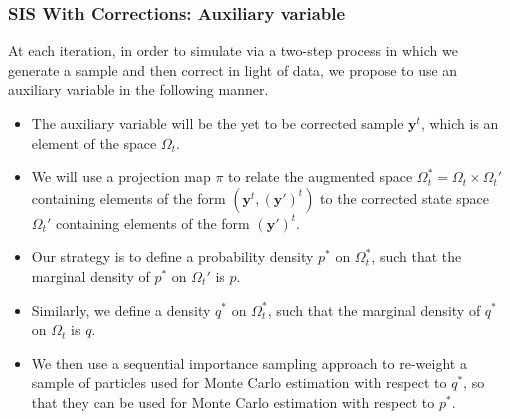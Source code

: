 \documentclass[9pt, xcolor={dvipsnames,svgnames,table}]{beamer}
\begin{document}
\begin{frame}
    \frametitle{SIS With Corrections: Auxiliary variable}
    At each iteration, in order to simulate via a two-step process in which we generate a sample and then correct in light of data, we propose to use an auxiliary variable in the following manner.
    \begin{itemize}
        \item The auxiliary variable will be the yet to be corrected sample $\bm{y}^{t}$, which is an element of the space $\Omega_t$.
        \item We will use a projection map $\pi$ to relate the augmented space $\Omega^*_t = \Omega_t \times \Omega_t'$ containing elements of the form $(\bm{y}^{t}, \bm{(y')}^{t})$ to the corrected state space $\Omega_t'$ containing elements of the form $\bm{(y')}^{t}$.
        \item Our strategy is to define a probability density $p^*$ on $\Omega^*_t$, such that the marginal density of $p^*$ on $\Omega_t'$ is $p$.
        \item Similarly, we define a density $q^*$ on $\Omega^*_t$, such that the marginal density of $q^*$ on $\Omega_t$ is $q$.
        \item We then use a sequential importance sampling approach to re-weight a sample of particles used for Monte Carlo estimation with respect to $q^*$, so that they can be used for Monte Carlo estimation with respect to $p^*$.
    \end{itemize}
\end{frame}
\end{document}
